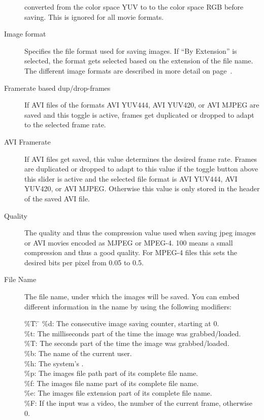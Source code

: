 \begin{description}
  converted from the color space YUV to to the color space RGB
  before saving. This is ignored for all movie formats.
\item[Image format] Specifies the file format used for saving
  images. If ``By Extension'' is selected, the format gets selected
  based on the extension of the file name. The different image
  formats are described in more detail on
  page~.
\item[Framerate based dup/drop-frames] If AVI files of the formats
  AVI YUV444, AVI YUV420, or AVI MJPEG are saved and this toggle is
  active, frames get duplicated or dropped to adapt to the selected
  frame rate.
\item[AVI Framerate] If AVI files get saved, this value determines
  the desired frame rate. Frames are duplicated or dropped to adapt
  to this value if the toggle button above this slider is
  active and the selected file format is AVI YUV444, AVI YUV420, or
  AVI MJPEG. Otherwise this value is only stored in the header of
  the saved AVI file.
\item[Quality] The quality and thus the compression value used when
  saving jpeg images or AVI movies encoded as MJPEG or MPEG-4. 100
  means a small compression and thus a good quality. For MPEG-4
  files this sets the desired bits per pixel from 0.05 to 0.5.
\item[File Name] The file name, under which the images will be
  saved. You can embed different information in the name by using
  the following modifiers:
  \begin{tabbing}
    \%T\=: \= \kill
    \%d\>:\> The consecutive image saving counter, starting at 0.\\
    \%t\>:\> The milliseconds part of the time the image was grabbed/loaded.\\
    \%T\>:\> The seconds part of the time the image was grabbed/loaded.\\
    \%b\>:\> The name of the current user.\\
    \%h\>:\> The system's .\\
    \%p\>:\> The images file path part of its complete file name.\\
    \%f\>:\> The images file name part of its complete file name.\\
    \%e\>:\> The images file extension part of its complete file name.\\
    \%F\>:\> If the input was a video, the number of the current frame, otherwise 0.\\

\end{tabbing}
\end{description}
